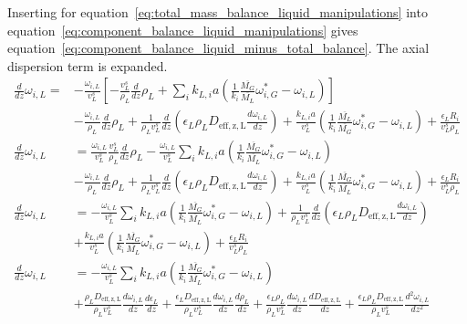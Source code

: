 \documentclass{article}
\begin{document}
Inserting for equation~\ref{eq:total_mass_balance_liquid_manipulations} into equation~\ref{eq:component_balance_liquid_manipulations} gives equation~\ref{eq:component_balance_liquid_minus_total_balance}. The axial dispersion term is expanded.
\begin{equation}
	\begin{split}
	\frac{d}{dz}\omega_{i,L} = &-\frac{\omega_{i,L}}{v_L^s} \left[ -\frac{v_L^s}{\rho_L}\frac{d}{dz}\rho_L + \sum_ik_{L,i}a(\frac{1}{k_i}\frac{\overline{M_G}}{\overline{M_L}}\omega_{i,G}^*-\omega_{i,L}) \right] \\
	&- \frac{\omega_{i,L}}{\rho_L} \frac{d}{dz}\rho_L+ \frac{1}{\rho_Lv_L^s}\frac{d}{dz}\left(\epsilon_L \rho_L D_{\mathrm{eff,z,L}}\frac{d\omega_{i,L}}{dz} \right)+ \frac{k_{L,i}a}{v_L^s}(\frac{1}{k_i}\frac{\overline{M_L}}{\overline{M_G}}\omega_{i,G}^*-\omega_{i,L}) + \frac{\epsilon_L R_i}{v_L^s\rho_L}\\
	\frac{d}{dz}\omega_{i,L}&= \frac{\omega_{i,L}}{v_L^s}\frac{v_L^s}{\rho_L}\frac{d}{dz}\rho_L - \frac{\omega_{i,L}}{v_L^s}\sum_ik_{L,i}a(\frac{1}{k_i}\frac{\overline{M_G}}{\overline{M_L}}\omega_{i,G}^*-\omega_{i,L}) \\
	&- \frac{\omega_{i,L}}{\rho_L} \frac{d}{dz}\rho_L+ \frac{1}{\rho_Lv_L^s}\frac{d}{dz}\left(\epsilon_L \rho_L D_{\mathrm{eff,z,L}}\frac{d\omega_{i,L}}{dz} \right)+ \frac{k_{L,i}a}{v_L^s}(\frac{1}{k_i}\frac{\overline{M_G}}{\overline{M_L}}\omega_{i,G}^*-\omega_{i,L}) + \frac{\epsilon_L R_i}{v_L^s\rho_L}\\
	\frac{d}{dz}\omega_{i,L}&= - \frac{\omega_{i,L}}{v_L^s}\sum_ik_{L,i}a(\frac{1}{k_i}\frac{\overline{M_G}}{\overline{M_L}}\omega_{i,G}^*-\omega_{i,L})  + \frac{1}{\rho_Lv_L^s}\frac{d}{dz}\left(\epsilon_L \rho_L D_{\mathrm{eff,z,L}}\frac{d\omega_{i,L}}{dz} \right)\\ 
	&+ \frac{k_{L,i}a}{v_L^s}(\frac{1}{k_i}\frac{\overline{M_G}}{\overline{M_L}}\omega_{i,G}^*-\omega_{i,L}) + \frac{\epsilon_L R_i}{v_L^s\rho_L}\\
	\frac{d}{dz}\omega_{i,L}&= - \frac{\omega_{i,L}}{v_L^s}\sum_ik_{L,i}a(\frac{1}{k_i}\frac{\overline{M_G}}{\overline{M_L}}\omega_{i,G}^*-\omega_{i,L}) \\
	&+ \frac{\rho_L D_{\mathrm{eff,z,L}}}{\rho_L v_L^s}\frac{d\omega_{i,L}}{dz}\frac{d\epsilon_L}{dz} + \frac{\epsilon_L D_{\mathrm{eff,z,L}}}{\rho_L v_L^s} \frac{d\omega_{i,L}}{dz} \frac{d \rho_L}{dz} + \frac{\epsilon_L \rho_L}{\rho_L v_L^s}\frac{d\omega_{i,L}}{dz} \frac{d D_{\mathrm{eff,z,L}}}{dz} + \frac{\epsilon_L \rho_L D_{\mathrm{eff,z,L}}}{\rho_L v_L^s}\frac{d^2\omega_{i,L}}{dz^2}\\

\end{split}
\end{equation}
\end{document}
